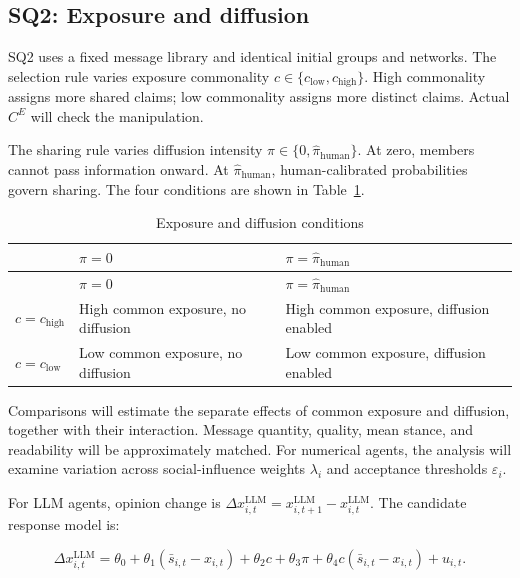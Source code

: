 \documentclass[11pt,a4paper]{article}
\begin{document}
\subsection{SQ2: Exposure and diffusion}

SQ2 uses a fixed message library and identical initial groups and networks. The selection rule varies exposure commonality $c\in\{c_{\text{low}},c_{\text{high}}\}$. High commonality assigns more shared claims; low commonality assigns more distinct claims. Actual $C^E$ will check the manipulation.

The sharing rule varies diffusion intensity $\pi\in\{0,\hat\pi_{\text{human}}\}$. At zero, members cannot pass information onward. At $\hat\pi_{\text{human}}$, human-calibrated probabilities govern sharing. The four conditions are shown in Table~\ref{tab:exposure_diffusion}.

{\small
\begin{longtable}{@{}>{\RaggedRight\arraybackslash}p{}>{\RaggedRight\arraybackslash}p{}>{\RaggedRight\arraybackslash}p{}@{}}
\caption{Exposure and diffusion conditions}\label{tab:exposure_diffusion}\\
\toprule
\textbf{} & \textbf{$\pi=0$} & \textbf{$\pi=\hat\pi_{\text{human}}$} \\
\midrule
\endfirsthead
\toprule
\textbf{} & \textbf{$\pi=0$} & \textbf{$\pi=\hat\pi_{\text{human}}$} \\
\midrule
\endhead
$c=c_{\text{high}}$ & High common exposure, no diffusion & High common exposure, diffusion enabled \\
$c=c_{\text{low}}$ & Low common exposure, no diffusion & Low common exposure, diffusion enabled \\
\bottomrule
\end{longtable}
}

Comparisons will estimate the separate effects of common exposure and diffusion, together with their interaction. Message quantity, quality, mean stance, and readability will be approximately matched. For numerical agents, the analysis will examine variation across social-influence weights $\lambda_i$ and acceptance thresholds $\varepsilon_i$.

For LLM agents, opinion change is $\Delta x^{\text{LLM}}_{i,t}=x^{\text{LLM}}_{i,t+1}-x^{\text{LLM}}_{i,t}$. The candidate response model is:

\begin{equation*}
\Delta x^{\text{LLM}}_{i,t}
=
\theta_0
+
\theta_1(\bar s_{i,t}-x_{i,t})
+
\theta_2c
+
\theta_3\pi
+
\theta_4c(\bar s_{i,t}-x_{i,t})
+
u_{i,t}.
\end{equation*}
\end{document}
